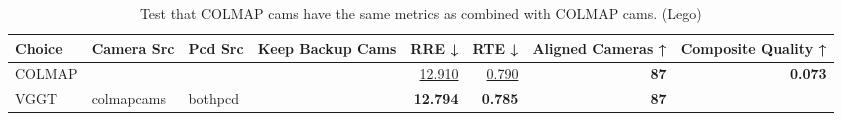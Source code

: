 \begin{table}[H]
\caption{Test that COLMAP cams have the same metrics as combined with COLMAP cams. (Lego)}
\label{tab:07_combined_test_lego}
\begin{tabular}{lllrrrrr}
\toprule
Choice & Camera Src & Pcd Src & Keep Backup Cams & RRE ↓ & RTE ↓ & Aligned Cameras ↑ & Composite Quality ↑ \\
\midrule
COLMAP &  &  &  & \underline{12.910} & \underline{0.790} & \textbf{87} & \textbf{0.073} \\
VGGT & colmapcams & bothpcd &  & \textbf{12.794} & \textbf{0.785} & \textbf{87} &  \\
\bottomrule
\end{tabular}
\end{table}
